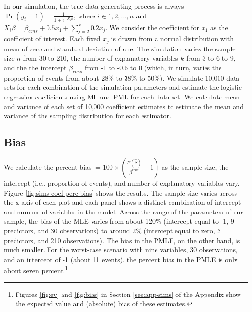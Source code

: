 \documentclass[12pt]{article}
\begin{document}
In our simulation, the true data generating process is always $\Pr(y_i = 1) = \frac{1}{1 + e^{-X_i \beta}}$, where $i \in 1, 2,..., n$ and $X_i \beta = \beta_{cons} + 0.5 x_1 + \sum_{j = 2}^k 0.2 x_j$. 
We consider the coefficient for $x_1$ as the coefficient of interest.
Each fixed $x_j$ is drawn from a normal distribution with mean of zero and standard deviation of one. 
The simulation varies the sample size $n$ from 30 to 210, the number of explanatory variables $k$ from 3 to 6 to 9, and the the intercept $\beta_{cons}$ from -1 to -0.5 to 0 (which, in turn, varies the proportion of events from about 28\% to 38\% to 50\%). 
We simulate 10,000 data sets for each combination of the simulation parameters and estimate the logistic regression coefficients using ML and PML for each data set.
We calculate mean and variance of each set of 10,000 coefficient estimates to estimate the mean and variance of the sampling distribution for each estimator. 

\subsection*{Bias}

We calculate the percent bias $= 100 \times \left(\frac{E(\hat{\beta})}{\beta^{true}} - 1 \right)$ as the sample size, the intercept (i.e., proportion of events), and number of explanatory variables vary.  
Figure \ref{fig:sims-coef-perc-bias} shows the results. 
The sample size varies across the x-axis of each plot and each panel shows a distinct combination of intercept and number of variables in the model. 
Across the range of the parameters of our sample, the bias of the MLE varies from about 120\% (intercept equal to -1, 9 predictors, and 30 observations) to around 2\% (intercept equal to zero, 3 predictors, and 210 observations). 
The bias in the PMLE, on the other hand, is much smaller. 
For the worst-case scenario with nine variables, 30 observations, and an intercept of -1 (about 11 events), the percent bias in the PMLE is only about seven percent.\footnote{Figures \ref{fig:ev} and \ref{fig:bias} in Section \ref{sec:app-sims} of the Appendix show the expected value and (absolute) bias of these estimates.}
\end{document}
